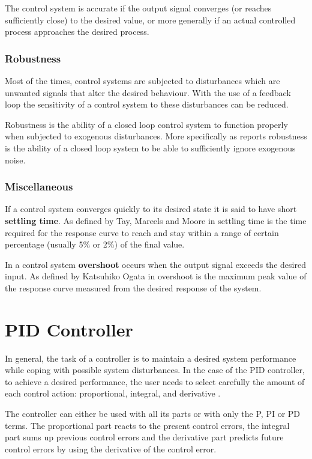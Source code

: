 The control system is accurate if the output signal converges (or reaches sufficiently close) to the desired value, or more generally if an actual controlled process approaches the desired process.

\subsubsection*{Robustness}
Most of the times, control systems are subjected to disturbances which are unwanted signals that alter the desired behaviour. With the use of a feedback loop the sensitivity of a control system to these disturbances can be reduced.

Robustness is the ability of a closed loop control system to function properly when subjected to exogenous disturbances. More specifically as \cite{grimble2006robust} reports robustness is the ability of a closed loop system to be able to sufficiently  ignore exogenous noise. 



\subsubsection*{Miscellaneous}

If a control system converges quickly to its desired state it is said to have short \textbf{settling time}. As defined by Tay, Mareels and Moore in \cite{tay1998high} settling time is the time required for the response curve to reach and stay within a range of certain percentage (usually 5\% or 2\%) of the final value.

In a control system \textbf{overshoot} occurs when the output signal exceeds the desired input. 
As defined by Katsuhiko Ogata in \cite{ogata1995discrete} overshoot is the maximum peak value of the response curve measured from the desired response of the system.


\section{PID Controller}

In general, the task of a controller is to maintain a desired system performance while coping with possible system disturbances. In the case of the PID controller, to achieve a desired performance, the user needs to select carefully the amount of each control action: proportional, integral, and derivative \cite{aastrom1995pid}.

The controller can either be used with all its parts or with only the P, PI or PD terms. The proportional part reacts to the present control errors, the integral part sums up previous control errors and the derivative part predicts future control errors by using the derivative of the control error.

